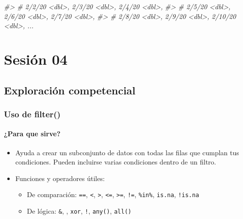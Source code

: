 \documentclass[
]{book}
\newenvironment{Shaded}{\begin{snugshade}}{\end{snugshade}}
\newcommand{\CommentTok}[1]{\textcolor[rgb]{0.56,0.35,0.01}{\textit{#1}}}
\begin{document}
\begin{Shaded}
\begin{Highlighting}[]
\CommentTok{\#\textgreater{} \#   \textasciigrave{}2/2/20\textasciigrave{} \textless{}dbl\textgreater{}, \textasciigrave{}2/3/20\textasciigrave{} \textless{}dbl\textgreater{}, \textasciigrave{}2/4/20\textasciigrave{} \textless{}dbl\textgreater{},}
\CommentTok{\#\textgreater{} \#   \textasciigrave{}2/5/20\textasciigrave{} \textless{}dbl\textgreater{}, \textasciigrave{}2/6/20\textasciigrave{} \textless{}dbl\textgreater{}, \textasciigrave{}2/7/20\textasciigrave{} \textless{}dbl\textgreater{},}
\CommentTok{\#\textgreater{} \#   \textasciigrave{}2/8/20\textasciigrave{} \textless{}dbl\textgreater{}, \textasciigrave{}2/9/20\textasciigrave{} \textless{}dbl\textgreater{}, \textasciigrave{}2/10/20\textasciigrave{} \textless{}dbl\textgreater{}, ...}
\end{Highlighting}
\end{Shaded}

\hypertarget{sesiuxf3n-04}{%
\chapter{Sesión 04}\label{sesiuxf3n-04}}

\hypertarget{exploraciuxf3n-competencial-1}{%
\section{Exploración competencial}\label{exploraciuxf3n-competencial-1}}

\hypertarget{uso-de-filter}{%
\subsection{Uso de filter()}\label{uso-de-filter}}

\hypertarget{para-que-sirve-1}{%
\subsubsection{¿Para que sirve?}\label{para-que-sirve-1}}

\begin{itemize}
\item
  Ayuda a crear un subconjunto de datos con todas las filas que cumplan tus condiciones.
  Pueden incluirse varias condiciones dentro de un filtro.
\item
  Funciones y operadores útiles:

  \begin{itemize}
  \item
    De comparación: \texttt{==}, \texttt{\textless{}}, \texttt{\textgreater{}}, \texttt{\textless{}=}, \texttt{\textgreater{}=}, \texttt{!=}, \texttt{\%in\%}, \texttt{is.na}, \texttt{!is.na}
  \item
    De lógica: \texttt{\&}, \texttt{\textbar{}}, \texttt{xor}, \texttt{!}, \texttt{any()}, \texttt{all()}
  \end{itemize}
\end{itemize}
\end{document}
